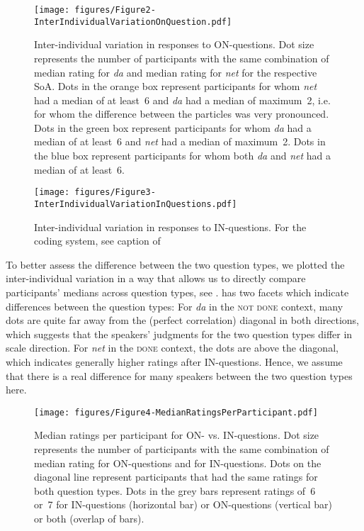 \documentclass[output=paper,colorlinks,citecolor=brown]{langscibook}
\begin{document}
\begin{figure}
\texttt{[image: figures/Figure2-InterIndividualVariationOnQuestion.pdf]} 
\caption{Inter-individual variation in responses to ON-questions. Dot size represents the number of participants with the same combination of median rating for \textit{da} and median rating for \textit{net} for the respective SoA. Dots in the orange box represent participants for whom \textit{net} had a median of at least~6 and \textit{da} had a median of maximum~2, i.e. for whom the difference between the particles was very pronounced. Dots in the green box represent participants for whom \textit{da} had a median of at least~6 and \textit{net} had a median of maximum~2. Dots in the blue box represent participants for whom both \textit{da} and \textit{net} had a median of at least~6.}
\label{geist-repp:fig:InterIndividualVariationOnQuestion}
\end{figure}



\begin{figure}
\texttt{[image: figures/Figure3-InterIndividualVariationInQuestions.pdf]}
\caption{Inter-individual variation in responses to IN-questions. For the coding system, see caption of }
\label{geist-repp:fig:InterIndividualVariationInQuestion}
\end{figure}

To better assess the difference between the two question types, we plotted the inter-individual variation in a way that allows us to directly compare participants’ medians across question types, see .  has two facets which indicate differences between the question types: For \textit{da} in the \textsc{not done} context, many dots are quite far away from the (perfect correlation) diagonal in both directions, which suggests that the speakers’ judgments for the two question types differ in scale direction. For \textit{net} in the \textsc{done} context, the dots are above the diagonal, which indicates generally higher ratings after IN-questions. Hence, we assume that there is a real difference for many speakers between the two question types here.


\begin{figure}
\texttt{[image: figures/Figure4-MedianRatingsPerParticipant.pdf]}
\caption{Median ratings per participant for ON- vs. IN-questions. Dot size represents the number of participants with the same combination of median rating for ON-questions and for IN-questions. Dots on the diagonal line represent participants that had the same ratings for both question types. Dots in the grey bars represent ratings of~6 or~7 for IN-questions (horizontal bar) or ON-questions (vertical bar) or both (overlap of bars).}
\label{geist-repp:fig:MedianRatingsPerParticipant}
\end{figure}
\end{document}
